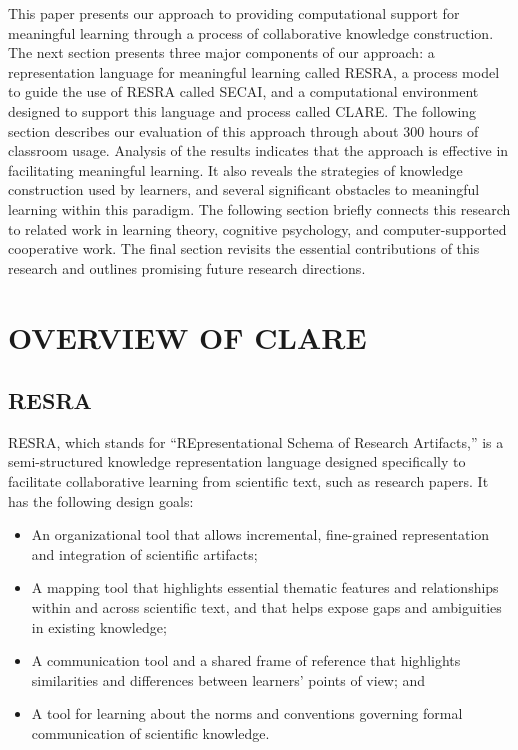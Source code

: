 This paper presents our approach to providing computational support for
meaningful learning through a process of collaborative knowledge
construction.  The next section presents three major components of our
approach: a representation language for meaningful learning called RESRA, a
process model to guide the use of RESRA called SECAI, and a computational
environment designed to support this language and process called CLARE.
The following section describes our evaluation of this approach through
about 300 hours of classroom usage. Analysis of the results indicates that
the approach is effective in facilitating meaningful learning. It also
reveals the strategies of knowledge construction used by learners, and
several significant obstacles to meaningful learning within this paradigm.
The following section briefly connects this research to related work in
learning theory, cognitive psychology, and computer-supported cooperative
work. The final section revisits the essential contributions of this
research and outlines promising future research directions.


\section{OVERVIEW OF CLARE}
\label{sec:clare-approach}

\subsection{RESRA}
\label{sec:resra}

RESRA, which stands for ``REpresentational Schema of Research Artifacts,''
is a semi-structured knowledge representation language designed
specifically to facilitate collaborative learning from scientific text,
such as research papers. It has the following design goals:

\begin{itemize}
\item An organizational tool that allows incremental, fine-grained
  representation and integration of scientific artifacts;
  
\item A mapping tool that highlights essential thematic features and
  relationships within and across scientific text, and that helps
  expose gaps and ambiguities in existing knowledge;
  
\item A communication tool and a shared frame of reference that
  highlights similarities and differences between learners'
  points of view; and
  
\item A tool for learning about the norms and conventions governing formal
  communication of scientific knowledge.
\end{itemize}

